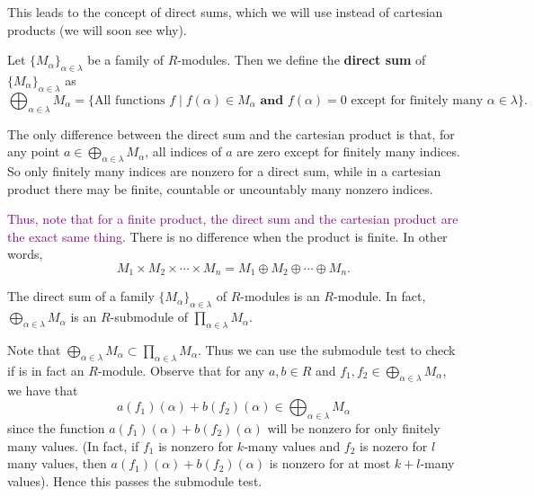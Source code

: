 \documentclass[12pt,letterpaper]{algebra_book}
\theoremstyle{definition}
\begin{document}
This leads to the concept of direct sums, which we will use
instead of cartesian products (we will soon see why).

\begin{definition}
    Let $\{M_\alpha\}_{\alpha \in \lambda}$ be a family of
    $R$-modules. Then we define the \textbf{direct sum} of
    $\{M_\alpha\}_{\alpha \in \lambda}$ as 
    \[
        \bigoplus_{\alpha \in \lambda}M_\alpha = \{\text{All functions } f \mid f(\alpha) \in M_\alpha \textbf{ and } f(\alpha) = 0 \text{ except for finitely many } \alpha \in \lambda\}.
    \]
\end{definition}

The only
difference between the direct sum and the cartesian product is that, for any point
$\displaystyle a \in \bigoplus_{\alpha \in \lambda} M_\alpha$, all
indices of $a$ are zero except for finitely many indices. So
only finitely many indices are nonzero for a direct sum, while
in a cartesian product there may be finite, countable or
uncountably many nonzero indices.


\textcolor{purple}{Thus, note that for a finite product, the direct sum
and the cartesian product are the exact same thing}. There is no
difference when the product is finite. In other words, 
\[
    M_1 \times M_2 \times \cdots \times M_n = M_1 \oplus M_2 \oplus \cdots \oplus M_n.
\]

\begin{proposition}
    The direct sum of a family $\{M_\alpha\}_{\alpha \in
    \lambda}$ of $R$-modules is an $R$-module. In fact,
    $\displaystyle \bigoplus_{\alpha \in 
    \lambda} M_\alpha$ is an $R$-submodule of $\displaystyle \prod_{\alpha \in \lambda} M_{\alpha}$.
\end{proposition}

\begin{prf}
    Note that $\displaystyle \bigoplus_{\alpha \in \lambda}
    M_\alpha \subset \prod_{\alpha \in \lambda}M_\alpha$. Thus we
    can use the submodule test to check if is in fact an
    $R$-module. Observe that for any $a, b \in R$ and
    $\displaystyle f_1, f_2
    \in \bigoplus_{\alpha \in \lambda}M_{\alpha}$, we have that 
    \[
        a(f_1)(\alpha) + b(f_2)(\alpha) \in \bigoplus_{\alpha \in \lambda}M_{\alpha} 
    \]
    since the function $a(f_1)(\alpha) + b(f_2)(\alpha)$ will be
    nonzero for only finitely many values. (In fact, if $f_1$ is
    nonzero for $k$-many values and $f_2$ is nozero for $l$ many
    values, then $a(f_1)(\alpha) + b(f_2)(\alpha)$ is nonzero for
    at most $k + l$-many values). Hence this passes the submodule
    test.
\end{prf}
\end{document}
